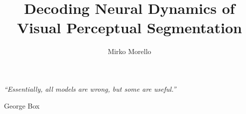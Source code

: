 \documentclass[utf8]{styles/tthesis}
\title{Decoding Neural Dynamics of Visual Perceptual Segmentation}
\author{Mirko Morello}
\begin{document}



\cleardoublepage
\frontmatter
{}
\setcounter{page}{1}


\chapter*{\mbox{}}

\begin{flushright}
\thispagestyle{empty}
\null{}
{\it ``Essentially, all models are wrong, but some are useful.''

\vspace{10pt}
George Box
}
\null
\end{flushright}
%
\thispagestyle{empty}
\mbox{}
\newpage





\tableofcontents
\listoffigures
\listoftables




\mainmatter




%






\label{Bibliography}


\end{document}
